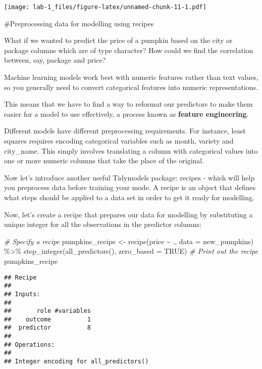 \documentclass[
]{article}
\newenvironment{Shaded}{\begin{snugshade}}{\end{snugshade}}
\newcommand{\AttributeTok}[1]{\textcolor[rgb]{0.77,0.63,0.00}{#1}}
\newcommand{\CommentTok}[1]{\textcolor[rgb]{0.56,0.35,0.01}{\textit{#1}}}
\newcommand{\ConstantTok}[1]{\textcolor[rgb]{0.00,0.00,0.00}{#1}}
\newcommand{\FunctionTok}[1]{\textcolor[rgb]{0.00,0.00,0.00}{#1}}
\newcommand{\NormalTok}[1]{#1}
\newcommand{\OtherTok}[1]{\textcolor[rgb]{0.56,0.35,0.01}{#1}}
\newcommand{\SpecialCharTok}[1]{\textcolor[rgb]{0.00,0.00,0.00}{#1}}
\begin{document}
\texttt{[image: lab-1\_files/figure-latex/unnamed-chunk-11-1.pdf]}

\#Preprocessing data for modelling using recipes

What if we wanted to predict the price of a pumpkin based on the city or
package columns which are of type character? How could we find the
correlation between, say, package and price?

Machine learning models work best with numeric features rather than text
values, so you generally need to convert categorical features into
numeric representations.

This means that we have to find a way to reformat our predictors to make
them easier for a model to use effectively, a process known as
\textbf{feature engineering}.

Different models have different preprocessing requirements. For
instance, least squares requires encoding categorical variables such as
month, variety and city\_name. This simply involves translating a column
with categorical values into one or more numeric columns that take the
place of the original.

Now let's introduce another useful Tidymodels package: recipes - which
will help you preprocess data before training your mode. A recipe is an
object that defines what steps should be applied to a data set in order
to get it ready for modelling.

Now, let's create a recipe that prepares our data for modelling by
substituting a unique integer for all the observations in the predictor
columns:

\begin{Shaded}
\begin{Highlighting}[]
\CommentTok{\# Specify a recipe}
\NormalTok{pumpkins\_recipe }\OtherTok{\textless{}{-}} \FunctionTok{recipe}\NormalTok{(price }\SpecialCharTok{\textasciitilde{}}\NormalTok{ ., }\AttributeTok{data =}\NormalTok{ new\_pumpkins) }\SpecialCharTok{\%\textgreater{}\%} 
  \FunctionTok{step\_integer}\NormalTok{(}\FunctionTok{all\_predictors}\NormalTok{(), }\AttributeTok{zero\_based =} \ConstantTok{TRUE}\NormalTok{)}
\CommentTok{\# Print out the recipe}
\NormalTok{pumpkins\_recipe}
\end{Highlighting}
\end{Shaded}

\begin{verbatim}
## Recipe
## 
## Inputs:
## 
##       role #variables
##    outcome          1
##  predictor          8
## 
## Operations:
## 
## Integer encoding for all_predictors()
\end{verbatim}
\end{document}
